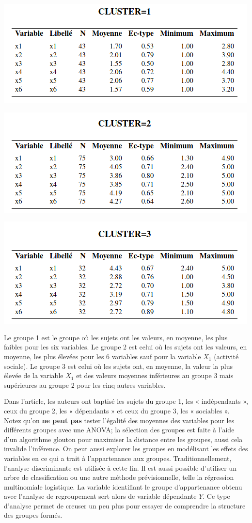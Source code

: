 \documentclass[
  11pt,
  letterpaper,
]{book}
\theoremstyle{definition}
\theoremstyle{definition}
\theoremstyle{definition}
\theoremstyle{remark}
\begin{document}
\begin{center}\includegraphics[width=0.55\linewidth]{figures/04-clustering-e11} \end{center}

\begin{center}\includegraphics[width=0.55\linewidth]{figures/04-clustering-e12} \end{center}

\begin{center}\includegraphics[width=0.55\linewidth]{figures/04-clustering-e13} \end{center}

Le groupe 1 est le groupe où les sujets ont les valeurs, en moyenne, les plus faibles pour les six variables. Le groupe 2 est celui où les sujets ont les valeurs, en moyenne, les plus élevées pour les 6 variables sauf pour la variable \(X_1\) (activité sociale). Le groupe 3 est celui où les sujets ont, en moyenne, la valeur la plus élevée de la variable \(X_1\) et des valeurs moyennes inférieures au groupe 3 mais supérieures au groupe 2 pour les cinq autres variables.

Dans l'article, les auteurs ont baptisé les sujets du groupe 1, les « indépendants », ceux du groupe 2, les « dépendants » et ceux du groupe 3, les « sociables ».
Notez qu'on \textbf{ne peut pas} tester l'égalité des moyennes des variables pour les différents groupes avec une ANOVA; la sélection des groupes est faite à l'aide d'un algorithme glouton pour maximiser la distance entre les groupes, aussi cela invalide l'inférence. On peut aussi explorer les groupes en modélisant les effets des variables en ce qui a trait à l'appartenance aux groupes. Traditionnellement, l'analyse discriminante est utilisée à cette fin. Il est aussi possible d'utiliser un arbre de classification ou une autre méthode prévisionnelle, telle la régression multinomiale logistique. La variable identifiant le groupe d'appartenance obtenu avec l'analyse de regroupement sert alors de variable dépendante \(Y\). Ce type d'analyse permet de creuser un peu plus pour essayer de comprendre la structure des groupes formés.
\end{document}
